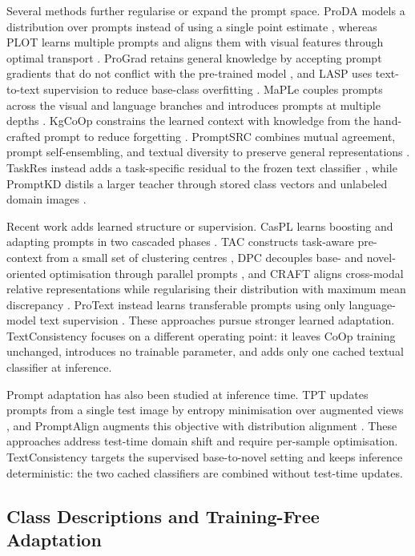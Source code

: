\documentclass[preprint,12pt]{elsarticle}
\begin{document}
Several methods further regularise or expand the prompt space. ProDA models a distribution over prompts instead of using a single point estimate \cite{lu2022proda}, whereas PLOT learns multiple prompts and aligns them with visual features through optimal transport \cite{chen2023plot}. ProGrad retains general knowledge by accepting prompt gradients that do not conflict with the pre-trained model \cite{zhu2023prograd}, and LASP uses text-to-text supervision to reduce base-class overfitting \cite{bulat2023lasp}. MaPLe couples prompts across the visual and language branches and introduces prompts at multiple depths \cite{khattak2023maple}. KgCoOp constrains the learned context with knowledge from the hand-crafted prompt to reduce forgetting \cite{yao2023kgcoop}. PromptSRC combines mutual agreement, prompt self-ensembling, and textual diversity to preserve general representations \cite{khattak2023promptsrc}. TaskRes instead adds a task-specific residual to the frozen text classifier \cite{yu2023taskres}, while PromptKD distils a larger teacher through stored class vectors and unlabeled domain images \cite{li2024promptkd}.

Recent work adds learned structure or supervision. CasPL learns boosting and adapting prompts in two cascaded phases \cite{wu2024caspl}. TAC constructs task-aware pre-context from a small set of clustering centres \cite{hao2025tac}, DPC decouples base- and novel-oriented optimisation through parallel prompts \cite{li2025dpc}, and CRAFT aligns cross-modal relative representations while regularising their distribution with maximum mean discrepancy \cite{sun2025craft}. ProText instead learns transferable prompts using only language-model text supervision \cite{khattak2025protext}. These approaches pursue stronger learned adaptation. TextConsistency focuses on a different operating point: it leaves CoOp training unchanged, introduces no trainable parameter, and adds only one cached textual classifier at inference.

Prompt adaptation has also been studied at inference time. TPT updates prompts from a single test image by entropy minimisation over augmented views \cite{shu2022tpt}, and PromptAlign augments this objective with distribution alignment \cite{samadh2023promptalign}. These approaches address test-time domain shift and require per-sample optimisation. TextConsistency targets the supervised base-to-novel setting and keeps inference deterministic: the two cached classifiers are combined without test-time updates.

\subsection{Class Descriptions and Training-Free Adaptation}
\end{document}
